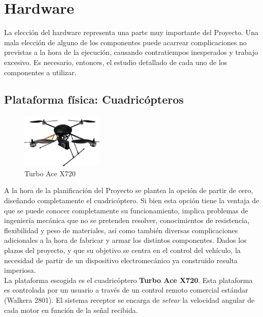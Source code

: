\documentclass[main]{subfiles}
\begin{document}
\chapter{Hardware}
La elecci\'on del hardware representa una parte muy importante del Proyecto. Una mala elecci\'on de alguno de los componentes puede acarrear complicaciones no previstas a la hora de la ejecuci\'on, causando contratiempos inesperados y trabajo excesivo. Es necesario, entonces, el estudio detallado de cada uno de los componentes a utilizar.

\section{Plataforma f\'isica: Cuadric\'opteros}

\begin{figure}
\vspace{20pt}
	\centering
	\includegraphics[width=0.35\textwidth]{./pics_eleccion_hardware/turboace.png}
	\caption{Turbo Ace X720}
	\label{fig:cuadricoptero}
\vspace{20pt}
\end{figure}

A la hora de la planificaci\'on del Proyecto se plantea la opci\'on de partir de cero, dise\~nando completamente el cuadric\'optero. Si bien esta opci\'on tiene la ventaja de que se puede conocer completamente su funcionamiento, implica problemas de ingenier\'ia mec\'anica que no se pretenden resolver, conocimientos de resistencia, flexibilidad y peso de materiales, as\'i como tambi\'en diversas complicaciones adicionales a la hora de fabricar y armar los distintos componentes. Dados los plazos del proyecto, y que su objetivo se centra en el control del veh\'iculo, la necesidad de partir de un dispositivo electromec\'anico ya construido resulta imperiosa.\\

La plataforma escogida es el cuadric\'optero \textbf{Turbo Ace X720}. Esta plataforma es controlada por un usuario a trav\'es de un control remoto comercial est\'andar (Walkera 2801). El sistema receptor se encarga de \emph{setear} la velocidad angular de cada motor en funci\'on de la se\~nal recibida.\\
\end{document}
